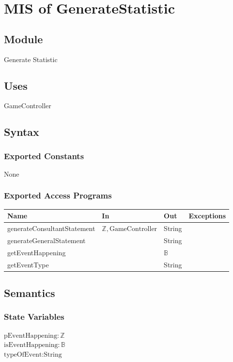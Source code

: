 \documentclass[12pt, titlepage]{article}
\begin{document}
\section{MIS of GenerateStatistic} 


\subsection{Module}
Generate Statistic

\subsection{Uses}
GameController


\subsection{Syntax}

\subsubsection{Exported Constants}
None

\subsubsection{Exported Access Programs}

\begin{center}
\begin{tabular}{p{6.5cm} p{4cm} p{3cm} p{2cm}}
\hline
\textbf{Name} & \textbf{In} & \textbf{Out} & \textbf{Exceptions} \\
\hline
generateConsultantStatement & $\mathbb{Z}, \text{GameController}$ & String & \\
\hline
generateGeneralStatement &  & String & \\
\hline
getEventHappening &  & $\mathbb{B}$ & \\
\hline
getEventType &  & String & \\
\hline
\end{tabular}
\end{center}

\subsection{Semantics}

\subsubsection{State Variables}
$\text{pEventHappening}: \text{$\mathbb{Z}$}$\\
$\text{isEventHappening}: \text{$\mathbb{B}$}$\\
$\text{typeOfEvent}: \text{String}$\\
\end{document}
